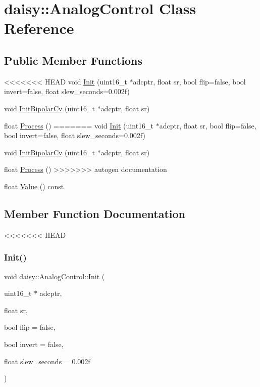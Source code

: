 \hypertarget{classdaisy_1_1_analog_control}{}\section{daisy\+:\+:Analog\+Control Class Reference}
\label{classdaisy_1_1_analog_control}
\subsection*{Public Member Functions}
\begin{DoxyCompactItemize}
\item 
<<<<<<< HEAD
void \hyperlink{classdaisy_1_1_analog_control_a516499f0788d7405024eff550386a59e}{Init} (uint16\+\_\+t $\ast$adcptr, float sr, bool flip=false, bool invert=false, float slew\+\_\+seconds=0.\+002f)
\item 
void \hyperlink{classdaisy_1_1_analog_control_aec736f5848fc9badbec878a48a7cd7c5}{Init\+Bipolar\+Cv} (uint16\+\_\+t $\ast$adcptr, float sr)
\item 
float \hyperlink{classdaisy_1_1_analog_control_a7109593bfc106dd8ef35aba4434b8321}{Process} ()
=======
void \hyperlink{classdaisy_1_1_analog_control_abaf976aa9d20be0ed179cd89040ab689}{Init} (uint16\+\_\+t $\ast$adcptr, float sr, bool flip=false, bool invert=false, float slew\+\_\+seconds=0.\+002f)
\item 
void \hyperlink{classdaisy_1_1_analog_control_a9b24917746fa0a7e63bd0c1d3079c8a0}{Init\+Bipolar\+Cv} (uint16\+\_\+t $\ast$adcptr, float sr)
\item 
float \hyperlink{classdaisy_1_1_analog_control_ab21a770e710eabe33839c03ea24552d3}{Process} ()
>>>>>>> autogen documentation
\item 
float \hyperlink{classdaisy_1_1_analog_control_a099ff147f24ae2220921d22729a66020}{Value} () const
\end{DoxyCompactItemize}


\subsection{Member Function Documentation}
<<<<<<< HEAD
\mbox{\label{classdaisy_1_1_analog_control_a516499f0788d7405024eff550386a59e}} 
\subsubsection{\texorpdfstring{Init()}{Init()}}
{\footnotesize\ttfamily void daisy\+::\+Analog\+Control\+::\+Init (\begin{DoxyParamCaption}\item[{uint16\+\_\+t $\ast$}]{adcptr,  }\item[{float}]{sr,  }\item[{bool}]{flip = {\ttfamily false},  }\item[{bool}]{invert = {\ttfamily false},  }\item[{float}]{slew\+\_\+seconds = {\ttfamily 0.002f} }\end{DoxyParamCaption})}


